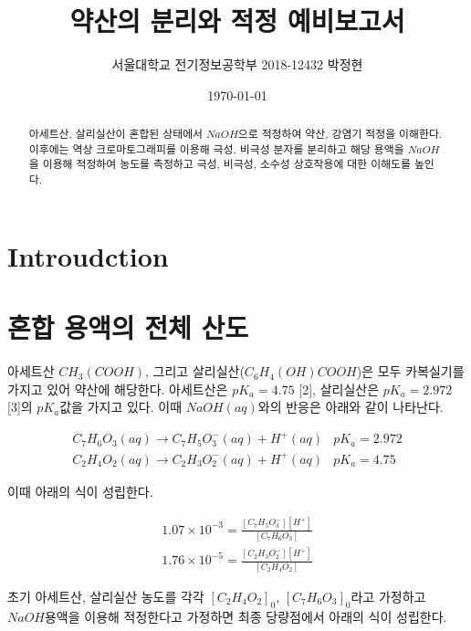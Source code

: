 \documentclass[%
 reprint,
 amsmath,amssymb,
 aps,
]{revtex4-2}
\begin{document}
\title{약산의 분리와 적정 예비보고서}

\author{서울대학교 전기정보공학부 2018-12432 박정현}
\date{\today}%

\begin{abstract}
아세트산, 살리실산이 혼합된 상태에서 $NaOH$으로 적정하여 약산, 강염기 적정을 이해한다. 이후에는 역상 크로마토그래피를 이용해 극성, 비극성 분자를 분리하고 해당 용액을 $NaOH$을 이용해 적정하여 농도를 측정하고 극성, 비극성, 소수성 상호작용에 대한 이해도를 높인다.
\end{abstract}

\maketitle


\section{\label{sec:level1}Introudction}
\section{\label{sec:level2}혼합 용액의 전체 산도}
아세트산 $CH_{3}(COOH)$, 그리고 살리실산($C_{6}H_{4}(OH)COOH$)은 모두 카복실기를 가지고 있어 약산에 해당한다. 아세트산은 $pK_{a}=4.75$ [2], 살리실산은 $pK_{a}=2.972$ [3]의 $pK_{a}$값을 가지고 있다. 이때 $NaOH(aq)$와의 반응은 아래와 같이 나타난다.

\begin{align}
	C_{7}H_{6}O_{3}(aq) \rightarrow C_{7}H_{5}O_{3}^{-}(aq) + H^{+}(aq) & pK_{a}=2.972\\
	C_{2}H_{4}O_{2}(aq) \rightarrow C_{2}H_{3}O_{2}^{-}(aq) + H^{+}(aq) & pK_{a}=4.75
\end{align}

이때 아래의 식이 성립한다.

\begin{align}
	1.07\times10^{-3} = \frac{[C_{7}H_{5}O_{3}^{-}][ H^{+}]}{[C_{7}H_{6}O_{3}]}\\
	1.76\times10^{-5} = \frac{[C_{2}H_{3}O_{2}^{-}][H^{+}]}{[C_{2}H_{4}O_{2}]}
\end{align}

초기 아세트산, 살리실산 농도를 각각 $[C_{2}H_{4}O_{2}]_{0}$, $[C_{7}H_{6}O_{3}]_{0}$라고 가정하고 $NaOH$용액을 이용해 적정한다고 가정하면 최종 당량점에서 아래의 식이 성립한다.
\end{document}
